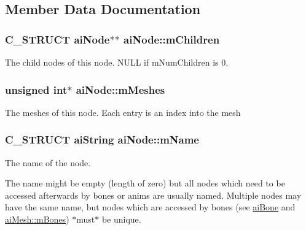 \subsection{\-Member \-Data \-Documentation}
\hypertarget{structaiNode_ac700679f0d4971f124e8444f68057291}{
\subsubsection[{m\-Children}]{\setlength{\rightskip}{0pt plus 5cm}\-C\-\_\-\-S\-T\-R\-U\-C\-T {\bf ai\-Node}$\ast$$\ast$ {\bf ai\-Node\-::m\-Children}}}\label{structaiNode_ac700679f0d4971f124e8444f68057291}
\-The child nodes of this node. \-N\-U\-L\-L if m\-Num\-Children is 0. \hypertarget{structaiNode_acd1706d6508b31916c18e39b7085ca63}{
\subsubsection[{m\-Meshes}]{\setlength{\rightskip}{0pt plus 5cm}unsigned int$\ast$ {\bf ai\-Node\-::m\-Meshes}}}\label{structaiNode_acd1706d6508b31916c18e39b7085ca63}
\-The meshes of this node. \-Each entry is an index into the mesh \hypertarget{structaiNode_afa528a7e43e15d92a920229b1ff094f6}{
\subsubsection[{m\-Name}]{\setlength{\rightskip}{0pt plus 5cm}\-C\-\_\-\-S\-T\-R\-U\-C\-T {\bf ai\-String} {\bf ai\-Node\-::m\-Name}}}\label{structaiNode_afa528a7e43e15d92a920229b1ff094f6}
\-The name of the node.

\-The name might be empty (length of zero) but all nodes which need to be accessed afterwards by bones or anims are usually named. \-Multiple nodes may have the same name, but nodes which are accessed by bones (see \hyperlink{structaiBone}{ai\-Bone} and \hyperlink{structaiMesh_a0c0582a7f45b340b6a33552c53232539}{ai\-Mesh\-::m\-Bones}) $\ast$must$\ast$ be unique.

